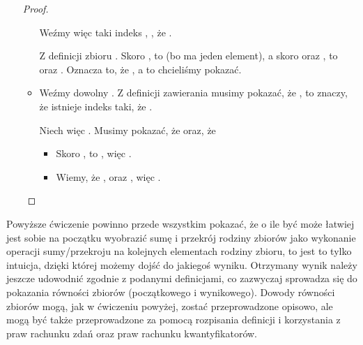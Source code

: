 \begin{example}
\begin{enumerate}
\begin{proof}
\begin{itemize}
        Weźmy więc taki indeks , , że . 
        
        Z definicji zbioru . Skoro , to  (bo  ma jeden element), a skoro  oraz , to  oraz . Oznacza to, że , a to chcieliśmy pokazać.
        
        \item {}
        
        Weźmy dowolny . Z definicji zawierania musimy pokazać, że , to znaczy, że istnieje indeks  taki, że .
        
        Niech więc . Musimy pokazać, że  oraz, że 
        
        \begin{itemize}
            \item Skoro , to , więc .
            \item Wiemy, że , oraz , więc .
        \end{itemize}
    \end{itemize}
    \end{proof}
    
\end{enumerate}

\end{example}

Powyższe ćwiczenie powinno przede wszystkim pokazać, że o ile być może łatwiej jest sobie na początku wyobrazić sumę i przekrój rodziny zbiorów jako wykonanie operacji sumy/przekroju na kolejnych elementach rodziny zbioru, to jest to tylko intuicja, dzięki której możemy dojść do jakiegoś wyniku. Otrzymany wynik należy jeszcze udowodnić zgodnie z podanymi definicjami, co zazwyczaj sprowadza się do pokazania równości zbiorów (początkowego i wynikowego). Dowody równości zbiorów mogą, jak w ćwiczeniu powyżej, zostać przeprowadzone opisowo, ale mogą być także przeprowadzone za pomocą rozpisania definicji i korzystania z praw rachunku zdań oraz praw rachunku kwantyfikatorów.